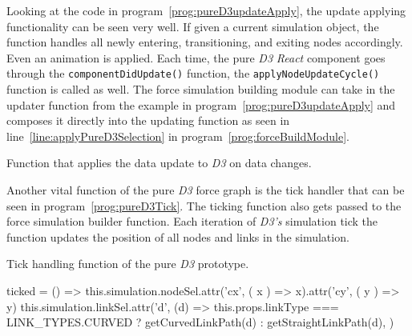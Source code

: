 Looking at the code in program~\ref{prog:pureD3updateApply}, the update applying functionality can be seen very well. If given a current simulation object, the function handles all newly entering, transitioning, and exiting nodes accordingly. Even an animation is applied. Each time, the pure \emph{D3} \emph{React} component goes through the \texttt{componentDidUpdate()} function, the \texttt{applyNodeUpdateCycle()} function is called as well. The force simulation building module can take in the updater function from the example in program~\ref{prog:pureD3updateApply} and composes it directly into the updating function as seen in line~\ref{line:applyPureD3Selection} in program~\ref{prog:forceBuildModule}.

\begin{program}[th]
\caption{Function that applies the data update to \emph{D3} on data changes.}
\label{prog:pureD3updateApply}
\end{program}

Another vital function of the pure \emph{D3} force graph is the tick handler that can be seen in program~\ref{prog:pureD3Tick}. The ticking function also gets passed to the force simulation builder function. Each iteration of \emph{D3's} simulation tick the function updates the position of all nodes and links in the simulation.

\begin{program}[th]
\caption{Tick handling function of the pure \emph{D3} prototype.}
\label{prog:pureD3Tick}
\begin{JsCode}
ticked = () => {
  this.simulation.nodeSel.attr('cx', ({ x }) => x).attr('cy', ({ y }) => y)
  this.simulation.linkSel.attr('d', (d) =>
    this.props.linkType === LINK_TYPES.CURVED ? getCurvedLinkPath(d) : getStraightLinkPath(d),
  )
}
\end{JsCode}
\end{program}

